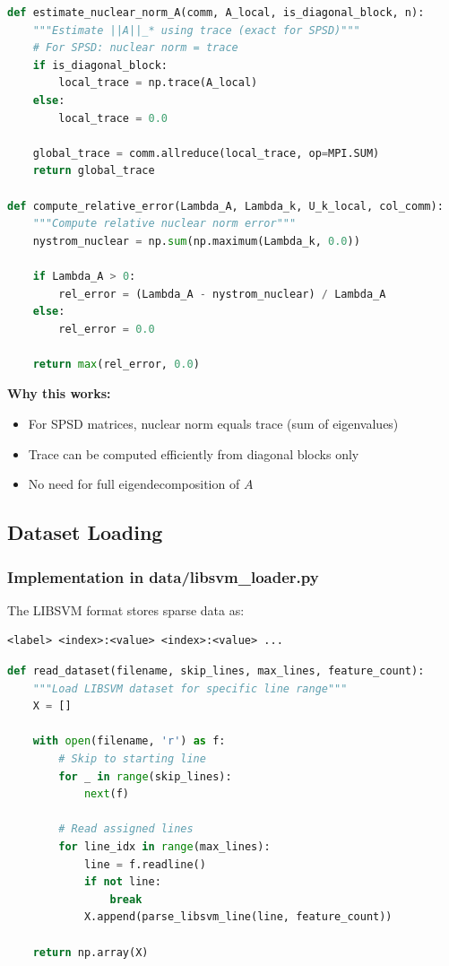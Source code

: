 \documentclass[11pt,a4paper]{article}
\begin{document}
\begin{lstlisting}[language=Python, caption={Nuclear norm estimation}]
def estimate_nuclear_norm_A(comm, A_local, is_diagonal_block, n):
    """Estimate ||A||_* using trace (exact for SPSD)"""
    # For SPSD: nuclear norm = trace
    if is_diagonal_block:
        local_trace = np.trace(A_local)
    else:
        local_trace = 0.0
    
    global_trace = comm.allreduce(local_trace, op=MPI.SUM)
    return global_trace

def compute_relative_error(Lambda_A, Lambda_k, U_k_local, col_comm):
    """Compute relative nuclear norm error"""
    nystrom_nuclear = np.sum(np.maximum(Lambda_k, 0.0))
    
    if Lambda_A > 0:
        rel_error = (Lambda_A - nystrom_nuclear) / Lambda_A
    else:
        rel_error = 0.0
    
    return max(rel_error, 0.0)
\end{lstlisting}

\textbf{Why this works:}
\begin{itemize}
    \item For SPSD matrices, nuclear norm equals trace (sum of eigenvalues)
    \item Trace can be computed efficiently from diagonal blocks only
    \item No need for full eigendecomposition of $A$
\end{itemize}

\subsection{Dataset Loading}

\subsubsection{Implementation in data/libsvm\_loader.py}

The LIBSVM format stores sparse data as:
\begin{verbatim}
<label> <index>:<value> <index>:<value> ...
\end{verbatim}

\begin{lstlisting}[language=Python, caption={Efficient LIBSVM parsing}]
def read_dataset(filename, skip_lines, max_lines, feature_count):
    """Load LIBSVM dataset for specific line range"""
    X = []
    
    with open(filename, 'r') as f:
        # Skip to starting line
        for _ in range(skip_lines):
            next(f)
        
        # Read assigned lines
        for line_idx in range(max_lines):
            line = f.readline()
            if not line:
                break
            X.append(parse_libsvm_line(line, feature_count))
    
    return np.array(X)
\end{lstlisting}
\end{document}
